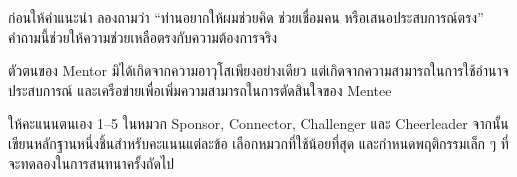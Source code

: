 \begin{mentornote}
ก่อนให้คำแนะนำ ลองถามว่า \enquote{ท่านอยากให้ผมช่วยคิด ช่วยเชื่อมคน หรือเสนอประสบการณ์ตรง} คำถามนี้ช่วยให้ความช่วยเหลือตรงกับความต้องการจริง
\end{mentornote}

\begin{keytakeaway}
ตัวตนของ Mentor มิได้เกิดจากความอาวุโสเพียงอย่างเดียว แต่เกิดจากความสามารถในการใช้อำนาจ ประสบการณ์ และเครือข่ายเพื่อเพิ่มความสามารถในการตัดสินใจของ Mentee
\end{keytakeaway}

\begin{reflection}
ให้คะแนนตนเอง 1--5 ในหมวก Sponsor, Connector, Challenger และ Cheerleader จากนั้นเขียนหลักฐานหนึ่งชิ้นสำหรับคะแนนแต่ละข้อ เลือกหมวกที่ใช้น้อยที่สุด และกำหนดพฤติกรรมเล็ก ๆ ที่จะทดลองในการสนทนาครั้งถัดไป
\blankline\blankline\blankline
\end{reflection}

